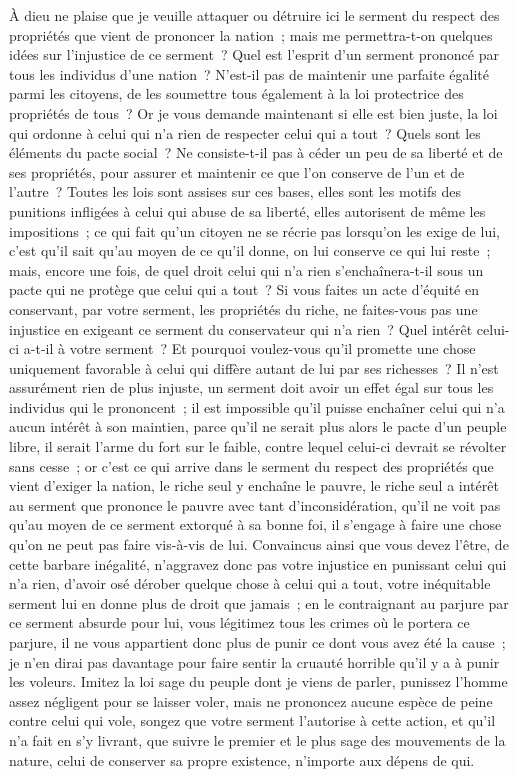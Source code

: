 \documentclass[french,twoside]{book} %
\begin{document}
À dieu ne plaise que je veuille attaquer ou détruire ici le serment du respect des propriétés que vient de prononcer la nation ; mais me permettra-t-on quelques idées sur l’injustice de ce serment ? Quel est l’esprit d’un serment prononcé par tous les individus d’une nation ? N’est-il pas de maintenir une parfaite égalité parmi les citoyens, de les soumettre tous également à la loi protectrice des propriétés de tous ? Or je vous demande maintenant si elle est bien juste, la loi qui ordonne à celui qui n’a rien de respecter celui qui a tout ? Quels sont les éléments du pacte social ? Ne consiste-t-il pas à céder un peu de sa liberté et de ses propriétés, pour assurer et maintenir ce que l’on conserve de l’un et de l’autre ? Toutes les lois sont assises sur ces bases, elles sont les motifs des punitions infligées à celui qui abuse de sa liberté, elles autorisent de même les impositions ; ce qui fait qu’un citoyen ne se récrie pas lorsqu’on les exige de lui, c’est qu’il sait qu’au moyen de ce qu’il donne, on lui conserve ce qui lui reste ; mais, encore une fois, de quel droit celui qui n’a rien s’enchaînera-t-il sous un pacte qui ne protège que celui qui a tout ? Si vous faites un acte d’équité en conservant, par votre serment, les propriétés du riche, ne faites-vous pas une injustice en exigeant ce serment du conservateur qui n’a rien ? Quel intérêt celui-ci a-t-il à votre serment ? Et pourquoi voulez-vous qu’il promette une chose uniquement favorable à celui qui diffère autant de lui par ses richesses ? Il n’est assurément rien de plus injuste, un serment doit avoir un effet égal sur tous les individus qui le prononcent ; il est impossible qu’il puisse enchaîner celui qui n’a aucun intérêt à son maintien, parce qu’il ne serait plus alors le pacte d’un peuple libre, il serait l’arme du fort sur le faible, contre lequel celui-ci devrait se révolter sans cesse ; or c’est ce qui arrive dans le serment du respect des propriétés que vient d’exiger la nation, le riche seul y enchaîne le pauvre, le riche seul a intérêt au serment que prononce le pauvre avec tant d’inconsidération, qu’il ne voit pas qu’au moyen de ce serment extorqué à sa bonne foi, il s’engage à faire une chose qu’on ne peut pas faire vis-à-vis de lui. Convaincus ainsi que vous devez l’être, de cette barbare inégalité, n’aggravez donc pas votre injustice en punissant celui qui n’a rien, d’avoir osé dérober quelque chose à celui qui a tout, votre inéquitable serment lui en donne plus de droit que jamais ; en le contraignant au parjure par ce serment absurde pour lui, vous légitimez tous les crimes où le portera ce parjure, il ne vous appartient donc plus de punir ce dont vous avez été la cause ; je n’en dirai pas davantage pour faire sentir la cruauté horrible qu’il y a à punir les voleurs. Imitez la loi sage du peuple dont je viens de parler, punissez l’homme assez négligent pour se laisser voler, mais ne prononcez aucune espèce de peine contre celui qui vole, songez que votre serment l’autorise à cette action, et qu’il n’a fait en s’y livrant, que suivre le premier et le plus sage des mouvements de la nature, celui de conserver sa propre existence, n’importe aux dépens de qui.\par
\end{document}
